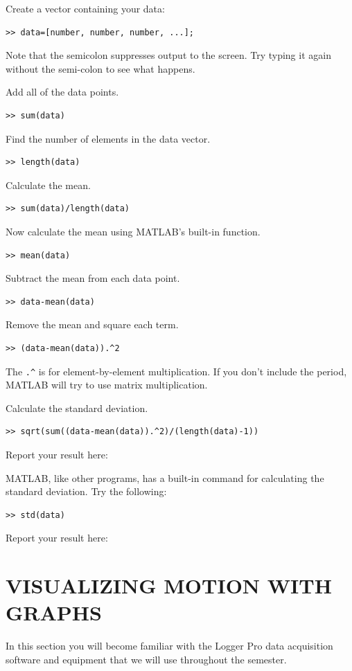 \documentclass[11pt,letterpaper]{article}
\begin{document}
 
Create a vector containing your data:
\begin{verbatim}>> data=[number, number, number, ...];\end{verbatim}
Note that the semicolon suppresses output to the screen. Try typing it again
without the semi-colon to see what happens.

Add all of the data points.
\begin{verbatim}>> sum(data)\end{verbatim}

Find the number of elements in the data vector.
\begin{verbatim}>> length(data)\end{verbatim} 

Calculate the mean.
\begin{verbatim}>> sum(data)/length(data)\end{verbatim}

Now calculate the mean using MATLAB's built-in function.
\begin{verbatim}>> mean(data)\end{verbatim}

Subtract the mean from each data point.
\begin{verbatim}>> data-mean(data)\end{verbatim}

Remove the mean and square each term. 
\begin{verbatim}>> (data-mean(data)).^2\end{verbatim}
The \verb!.^! is for element-by-element multiplication. If you don't include the period, MATLAB will try to use matrix multiplication.

Calculate the standard deviation.
\begin{verbatim}>> sqrt(sum((data-mean(data)).^2)/(length(data)-1))\end{verbatim}
Report your result here:

\bigskip
\bigskip
MATLAB, like other programs, has a built-in command for calculating the standard deviation. Try the following:
\begin{verbatim}>> std(data)
\end{verbatim}
Report your result here:

\section{VISUALIZING MOTION WITH GRAPHS}
In this section you will become familiar with the Logger Pro data acquisition software and equipment that we will use throughout the semester.
\end{document}
